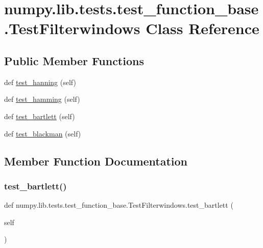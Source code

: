 \hypertarget{classnumpy_1_1lib_1_1tests_1_1test__function__base_1_1TestFilterwindows}{}\section{numpy.\+lib.\+tests.\+test\+\_\+function\+\_\+base.\+Test\+Filterwindows Class Reference}
\label{classnumpy_1_1lib_1_1tests_1_1test__function__base_1_1TestFilterwindows}
\subsection*{Public Member Functions}
\begin{DoxyCompactItemize}
\item 
def \hyperlink{classnumpy_1_1lib_1_1tests_1_1test__function__base_1_1TestFilterwindows_a0b06262059dfd5f703c7e5bb23149985}{test\+\_\+hanning} (self)
\item 
def \hyperlink{classnumpy_1_1lib_1_1tests_1_1test__function__base_1_1TestFilterwindows_a3b3655c778680846c7a8d24562c99908}{test\+\_\+hamming} (self)
\item 
def \hyperlink{classnumpy_1_1lib_1_1tests_1_1test__function__base_1_1TestFilterwindows_a9080babd93852db9b4ca6aab0f6e5c1a}{test\+\_\+bartlett} (self)
\item 
def \hyperlink{classnumpy_1_1lib_1_1tests_1_1test__function__base_1_1TestFilterwindows_a6c41421afadeb13959ef7181d01af1ce}{test\+\_\+blackman} (self)
\end{DoxyCompactItemize}


\subsection{Member Function Documentation}
\mbox{\label{classnumpy_1_1lib_1_1tests_1_1test__function__base_1_1TestFilterwindows_a9080babd93852db9b4ca6aab0f6e5c1a}} 
\subsubsection{\texorpdfstring{test\+\_\+bartlett()}{test\_bartlett()}}
{\footnotesize\ttfamily def numpy.\+lib.\+tests.\+test\+\_\+function\+\_\+base.\+Test\+Filterwindows.\+test\+\_\+bartlett (\begin{DoxyParamCaption}\item[{}]{self }\end{DoxyParamCaption})}

